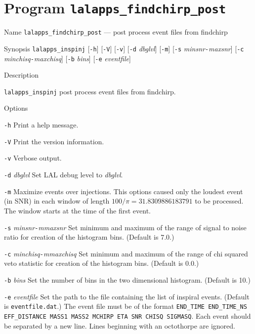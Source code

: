 \section{Program \texttt{lalapps\_findchirp\_post}}
\label{program:lalapps-findchirp-post}

\begin{entry}

\item[Name]
\verb$lalapps_findchirp_post$ --- post process event files from findchirp

\item[Synopsis]
\verb$lalapps_inspinj$ [\verb$-h$] [\verb$-V$] [\verb$-v$]
[\verb$-d$ \textit{dbglvl}]
[\verb$-m$]
[\verb$-s$ \textit{minsnr}\texttt{-}\textit{maxsnr}]
[\verb$-c$ \textit{minchisq}\texttt{-}\textit{maxchisq}]
[\verb$-b$ \textit{bins}]
[\verb$-e$ \textit{eventfile}]

\item[Description]

\verb$lalapps_inspinj$ post process event files from findchirp.

\item[Options]\leavevmode
\begin{entry}
\item[\texttt{-h}]
Print a help message.
\item[\texttt{-V}]
Print the version information.
\item[\texttt{-v}]
Verbose output.
\item[\texttt{-d} \textit{dbglvl}]
Set LAL debug level to \textit{dbglvl}.
\item[\texttt{-m}]
Maximize events over injections. This options caused only the loudest event
(in SNR) in each window of length $100/\pi = 31.8309886183791$ to be processed.
The window starts at the time of the first event.
\item[\texttt{-s} \textit{minsnr}\texttt{-}\textit{mmaxsnr}]
Set minimum and maximum of the range of signal to noise ratio for creation
of the histogram bins.  (Default is 7.0.)
\item[\texttt{-c} \textit{minchisq}\texttt{-}\textit{mmaxchisq}]
Set minimum and maximum of the range of chi squared veto statistic for
creation of the histogram bins.  (Default is 0.0.)
\item[\texttt{-b} \textit{bins}]
Set the number of bins in the two dimensional histogram. (Default is 10.)
\item[\texttt{-e} \textit{eventfile}]
Set the path to the file containing the list of inspiral events. 
(Default is \verb|eventfile.dat|.) The event file must be of the format
\verb|END_TIME END_TIME_NS EFF_DISTANCE MASS1 MASS2 MCHIRP ETA SNR CHISQ SIGMASQ|.
Each event should be separated by a new line. Lines beginning with an
octothorpe are ignored.
\end{entry}


\end{entry}
